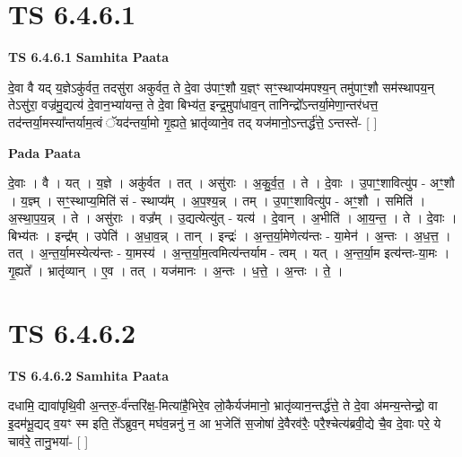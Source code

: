 \documentclass[17pt]{extarticle}
\begin{document}

\section{ TS 6.4.6.1 }

\textbf{TS 6.4.6.1 } \newline
\textbf{Samhita Paata} \newline

दे॒वा वै यद् य॒ज्ञेऽकु॑र्वत॒ तदसु॑रा अकुर्वत॒ ते दे॒वा उ॑पाꣳ॒॒शौ य॒ज्ञ्ꣳ सꣳ॒॒स्थाप्य॑मपश्य॒न् तमु॑पाꣳ॒॒शौ सम॑स्थापय॒न् तेऽसु॑रा॒ वज्र॑मु॒द्यत्य॑ दे॒वान॒भ्या॑यन्त॒ ते दे॒वा बिभ्य॑त॒ इन्द्र॒मुपा॑धाव॒न् तानिन्द्रो᳚ऽन्तर्या॒मेणा॒न्तर॑धत्त॒ तद॑न्तर्या॒मस्या᳚न्तर्याम॒त्वं ॅयद॑न्तर्या॒मो गृ॒ह्यते॒ भ्रातृ॑व्याने॒व तद् यज॑मानो॒ऽन्तर्द्ध॑त्ते॒ ऽन्तस्ते॑- [  ] \newline

\textbf{Pada Paata} \newline

दे॒वाः । वै । यत् । य॒ज्ञे । अकु॑र्वत । तत् । असु॑राः । अ॒कु॒र्व॒त॒ । ते । दे॒वाः । उ॒पाꣳ॒॒शावित्यु॑प - अꣳ॒॒शौ । य॒ज्ञ्म् । सꣳ॒॒स्थाप्य॒मिति॑ सं - स्थाप्य᳚म् । अ॒प॒श्य॒न्न् । तम् । उ॒पाꣳ॒॒शावित्यु॑प - अꣳ॒॒शौ । समिति॑ । अ॒स्था॒प॒य॒न्न् । ते । असु॑राः । वज्र᳚म् । उ॒द्यत्येत्यु॑त् - यत्य॑ । दे॒वान् । अ॒भीति॑ । आ॒य॒न्त॒ । ते । दे॒वाः । बिभ्य॑तः । इन्द्र᳚म् । उपेति॑ । अ॒धा॒व॒न्न् । तान् । इन्द्रः॑ । अ॒न्त॒र्या॒मेणेत्य॑न्तः - या॒मेन॑ । अ॒न्तः । अ॒ध॒त्त॒ । तत् । अ॒न्त॒र्या॒मस्येत्य॑न्तः - या॒मस्य॑ । अ॒न्त॒र्या॒म॒त्वमित्य॑न्तर्याम - त्वम् । यत् । अ॒न्त॒र्या॒म इत्य॑न्तः-या॒मः । गृ॒ह्यते᳚ । भ्रातृ॑व्यान् । ए॒व । तत् । यज॑मानः । अ॒न्तः । ध॒त्ते॒ । अ॒न्तः । ते॒ ।  \newline





\section{ TS 6.4.6.2 }

\textbf{TS 6.4.6.2 } \newline
\textbf{Samhita Paata} \newline

दधामि॒ द्यावा॑पृथि॒वी अ॒न्तरु॒-र्व॑न्तरि॑क्ष॒-मित्या॑है॒भिरे॒व लो॒कैर्यज॑मानो॒ भ्रातृ॑व्यान॒न्तर्द्ध॑त्ते॒ ते दे॒वा अ॑मन्य॒न्तेन्द्रो॒ वा इ॒दम॑भू॒द्यद् व॒यꣳ स्म इति॒ ते᳚ऽब्रुव॒न् मघ॑व॒न्ननु॑ न॒ आ भ॒जेति॑ स॒जोषा॑ दे॒वैरव॑रैः॒ परै॒श्चेत्य॑ब्रवी॒द्ये चै॒व दे॒वाः परे॒ ये चाव॑रे॒ तानु॒भया॑- [  ] \newline
\end{document}
